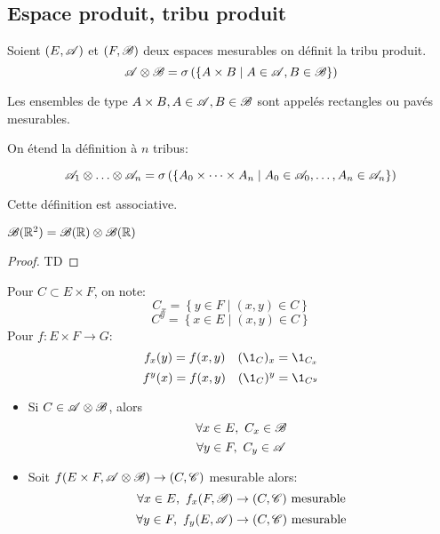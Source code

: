 \subsection{Espace produit, tribu produit}

\begin{definition}
	Soient $(E,\mathscr{A})$ et $(F,\mathscr{B})$ deux espaces mesurables on définit la tribu produit.
	$$\mathscr{A} \otimes \mathscr{B} = \sigma \left(\left\{ A \times B \mid A\in \mathscr{A}, B \in \mathscr{B} \right\}\right)$$
\end{definition}

\begin{remarque}
	Les ensembles de type $A\times B, A\in \mathscr{A}, B\in\mathscr{B}$ sont appelés rectangles ou pavés mesurables.
\end{remarque}


\begin{definition}
	On étend la définition à $n$ tribus:

	$$\triA_1 \xor \dots \xor \triA_n = \sigma \left(\left\{ A_0 \times \dots \times A_n \mid A_0\in \triA_0, \dots , A_n \in \triA_n \right\}\right)$$

	Cette définition est associative.
\end{definition}

\begin{prop}
	$\mathscr{B}(\mathbb{R}^2) = \mathscr{B}(\mathbb{R}) \otimes \mathscr{B}(\mathbb{R})$
\end{prop}

\begin{proof}
	TD %
\end{proof}

\begin{notation}
	Pour $C \subset E \times F$, on note:
	$$ C_x = \left\{ y \in F \mid (x,y) \in C \right\} $$
	$$ C^y = \left\{ x \in E \mid (x,y) \in C \right\} $$
	Pour $f: E \times F \to G$:
	$$f_x(y) = f(x,y) \quad (\1_C)_x = \1_{C_x}$$
	$$f^y(x) = f(x,y) \quad (\1_C)^y = \1_{C^y} $$
\end{notation}

\begin{prop}
	\begin{itemize}
		\item Si $C \in \mathscr{A} \otimes \mathscr{B}$, alors
		      $$\forall x \in E,\ C_x \in \mathscr{B}$$
		      $$\forall y \in F,\ C_y \in \mathscr{A}$$
		\item Soit $f (E\times F, \mathscr{A} \otimes \mathscr{B}) \to (C, \mathscr{C})$ mesurable alors:
		      $$\forall x \in E, \ f_x (F, \mathscr{B})  \to (C, \mathscr{C}) \text{ mesurable}$$
		      $$\forall y \in F, \ f_y (E, \mathscr{A})  \to (C, \mathscr{C}) \text{ mesurable}$$
	\end{itemize}
\end{prop}


